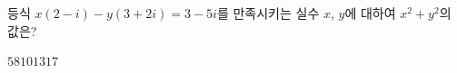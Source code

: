 등식 $x(2-i)-y(3+2i)=3-5i$를 만족시키는 실수 $x$, $y$에 대하여 $x^2+y^2$의 값은?
\begin{choices32}{$5$}{$8$}{$10$}{$13$}{$17$}\end{choices32}
